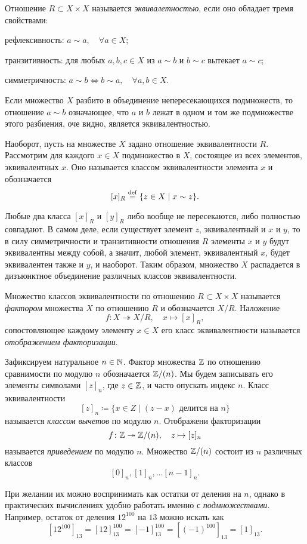 \begin{example}
    Отношение $R \subset X \times X$ называется \emph{эквивалетностью}, если оно обладает тремя свойствами: 
    \begin{conditions}
    \item рефлексивность: $a \sim a, \quad \forall a \in X$;
    \item транзитивность: для любых $a, b, c \in X$ из $a \sim b$ и $b \sim c $ вытекает $a \sim c$;
    \item симметричность: $a \sim b \iff b \sim a, \quad \forall a, b \in X$. \end{conditions}
\end{example}
Если множество $X$ разбито в объединение непересекающихся подмножеств, то отношение $a \sim b$ означающее, что $a$ и $b$ лежат в одном и том же подмножестве этого разбиения, оче видно, является эквивалентностью.

Наоборот, пусть на множестве $X$ задано отношение эквивалентности $R$. Рассмотрим для каждого $x \in X$ подмножество в $X$, состоящее из всех элементов, эквивалентных $x$. Оно называется классом эквивалентности элемента $x$ и обозначается 
\[[x]_R \overset{\footnotesize{\mathrm{def}}}{=} \{z \in X \mid x \sim z\}.\]

Любые два класса $[x]_R$ и $[y]_R$ либо вообще не пересекаются, либо полностью совпадают. В самом деле, если существует элемент $z$, эквивалентный и $x$ и $y$, то в силу симметричности и транзитивности отношения $R$ элементы $x$ и $y$ будут эквивалентны между собой, а значит, любой элемент, эквивалентный $x$, будет эквивалентен также и $y$, и наоборот. Таким образом, множество $X$ распадается в дизъюнктное объединение различных классов эквивалентности.

\begin{definition}[Факторизация]
    Множество классов эквивалентности по отношению $R \subset X \times X$ называется \emph{фактором} множества $X$ по отношению $R$ и обозначается $X/R$. Наложение \[f \colon X \twoheadrightarrow X/R, \quad x \mapsto [x]_R,\]
    сопостовляющее каждому элементу $x \in X$ его класс эквивалентности называется \emph{отображением факторизации}.
\end{definition}

\begin{example}
    Зафиксируем натуральное $n \in \mathbb N$. Фактор множества $\mathbb Z$ по отношению сравнимости по модулю $n$ обозначается $\mathbb Z/(n)$. Мы будем записывать его элементы символами $[z]_n$, где $z \in \mathbb Z$, и часто опускать индекс $n$. Класс эквивалентности \[[z]_n \coloneq \{x \in Z \mid (z -x ) \text{ делится на } n\}\] называется \emph{классом вычетов} по модулю $n$. Отображени факторизации \[f \colon \mathbb Z \twoheadrightarrow \mathbb Z/(n), \quad z \mapsto [z]_n\] называется \emph{приведением} по модулю $n$. Множество $\mathbb Z/(n)$ состоит из $n$ различных классов \[[0]_n ,[1]_n, \ldots [n-1]_n.\]

    При желании их можно воспринимать как остатки от деления на $n$, однако в практических вычислениях удобно работать именно с \emph{подмножествами}. Например, остаток от деления $12^{100}$ на $13$ можно искать как \[[12^{100}]_{13} = [12]_{13}^{100} = [-1]_{13}^{100} = [(-1)^{100}]_{13} = [1]_{13}.\]
\end{example}
